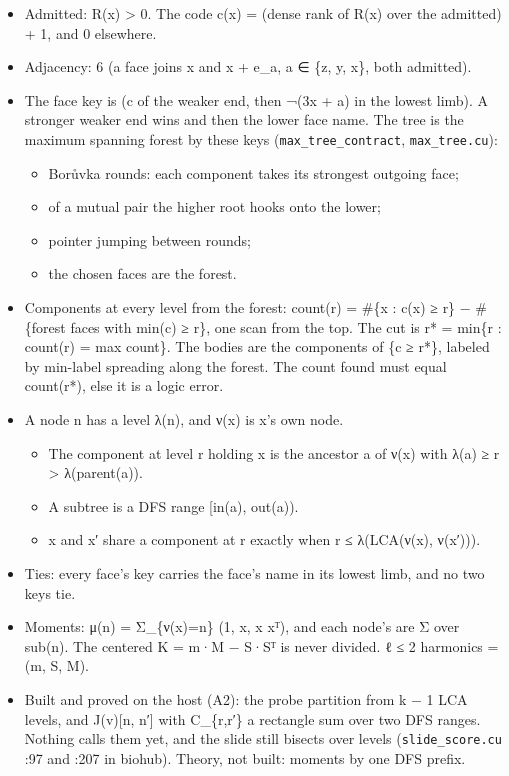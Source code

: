 \begin{itemize}
\item Admitted: R(x) > 0. The code c(x) = (dense rank of R(x) over the admitted) + 1, and 0 elsewhere.
\item Adjacency: 6 (a face joins x and x + e\_\allowbreak{}a, a ∈ \{z, y, x\}, both admitted).
\item The face key is (c of the weaker end, then ¬(3x + a) in the lowest limb). A stronger weaker end wins and then the lower face name. The tree is the maximum spanning forest by these keys (\texttt{max\_\allowbreak{}tree\_\allowbreak{}contract}, \texttt{max\_\allowbreak{}tree.\allowbreak{}cu}):

\begin{itemize}
\item Borůvka rounds: each component takes its strongest outgoing face;
\item of a mutual pair the higher root hooks onto the lower;
\item pointer jumping between rounds;
\item the chosen faces are the forest.
\end{itemize}
\item Components at every level from the forest: count(r) = \#\{x : c(x) ≥ r\} − \#\{forest faces with min(c) ≥ r\}, one scan from the top. The cut is r* = min\{r : count(r) = max count\}. The bodies are the components of \{c ≥ r*\}, labeled by min-label spreading along the forest. The count found must equal count(r*), else it is a logic error.
\item A node n has a level λ(n), and ν(x) is x's own node.

\begin{itemize}
\item The component at level r holding x is the ancestor a of ν(x) with λ(a) ≥ r > λ(parent(a)).
\item A subtree is a DFS range [in(a), out(a)).
\item x and x′ share a component at r exactly when r ≤ λ(LCA(ν(x), ν(x′))).
\end{itemize}
\item Ties: every face's key carries the face's name in its lowest limb, and no two keys tie.
\item Moments: μ(n) = Σ\_\allowbreak{}\{ν(x)=n\} (1, x, x xᵀ), and each node's are Σ over sub(n). The centered K = m·M − S·Sᵀ is never divided. ℓ ≤ 2 harmonics = (m, S, M).
\item Built and proved on the host (A2): the probe partition from k − 1 LCA levels, and J(v)[n, n′] with C\_\allowbreak{}\{r,r′\} a rectangle sum over two DFS ranges. Nothing calls them yet, and the slide still bisects over levels (\texttt{slide\_\allowbreak{}score.\allowbreak{}cu} :97 and :207 in biohub). Theory, not built: moments by one DFS prefix.
\end{itemize}

